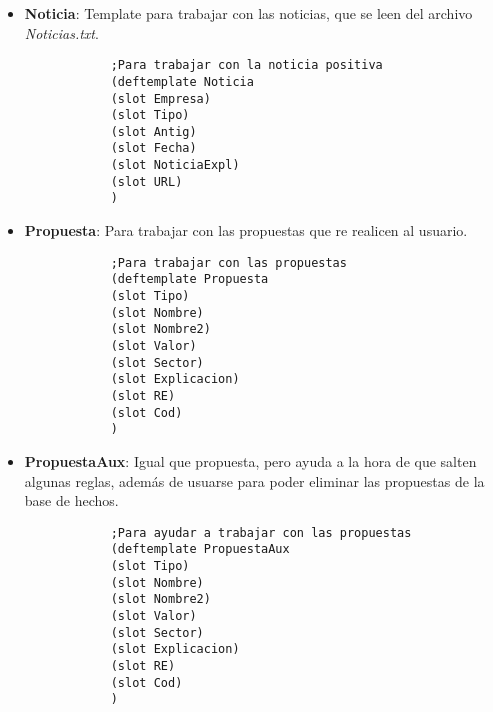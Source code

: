 \begin{itemize}
\begin{verbatim}
			(slot Nombre)
			(slot Valor)
			(slot Sector)
			(slot Explicacion)
			)
			\end{verbatim}
	\item \textbf{Noticia}: Template para trabajar con las noticias, que se leen del archivo \textit{Noticias.txt}.
			\begin{verbatim}
			;Para trabajar con la noticia positiva
			(deftemplate Noticia
			(slot Empresa)
			(slot Tipo)
			(slot Antig)
			(slot Fecha)
			(slot NoticiaExpl)
			(slot URL)
			)
			\end{verbatim}
	\item \textbf{Propuesta}: Para trabajar con las propuestas que re realicen al usuario.
			\begin{verbatim}
			;Para trabajar con las propuestas
			(deftemplate Propuesta
			(slot Tipo)
			(slot Nombre)
			(slot Nombre2)
			(slot Valor)
			(slot Sector)
			(slot Explicacion)
			(slot RE)
			(slot Cod)
			)
			\end{verbatim}
	\item \textbf{PropuestaAux}: Igual que propuesta, pero ayuda a la hora de que salten algunas reglas, además de usuarse para poder eliminar las propuestas de la base de hechos.
			\begin{verbatim}
			;Para ayudar a trabajar con las propuestas
			(deftemplate PropuestaAux
			(slot Tipo)
			(slot Nombre)
			(slot Nombre2)
			(slot Valor)
			(slot Sector)
			(slot Explicacion)
			(slot RE)
			(slot Cod)
			)
			\end{verbatim}
\end{itemize}
